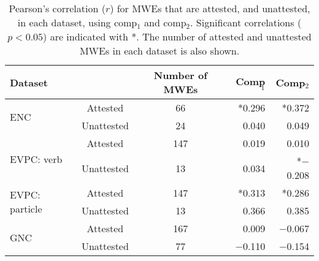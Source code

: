 \documentclass[11pt]{article}
\begin{document}
\begin{table}
\begin{center}
\begin{tabular}{lccrr}
Dataset &  & Number of MWEs & Comp$_1$ & Comp$_2$\\
\hline
\multirow{2}{*}{ENC} & Attested   & \phantom{1}66 & *0.296 & *0.372 \\
                     & Unattested & \phantom{1}24 & 0.040 & 0.049 \\
\hline

\multirow{2}{*}{EVPC: verb} & Attested   & 147            & 0.019 & 0.010\\
                            & Unattested & \phantom{1}13  & 0.034 & *$-$0.208\\
\hline

\multirow{2}{*}{EVPC: particle} & Attested   & 147 & *0.313 & *0.286 \\
                                & Unattested & \phantom{1}13  & 0.366 & 0.385\\
\hline

\multirow{2}{*}{GNC} & Attested & 167           & 0.009& $-$0.067\\
                     & Unattested & \phantom{1}77 & $-$0.110 & $-$0.154\\
\end{tabular}
\caption{Pearson's correlation ($r$) for MWEs that are attested, and
  unattested, in each dataset, using comp$_1$ and
  comp$_2$. Significant correlations ($p<0.05$) are indicated with
  *. The number of attested and unattested MWEs in each dataset is
  also shown.
\label{tab:results:freq}}
\end{center}
\end{table}
\end{document}
